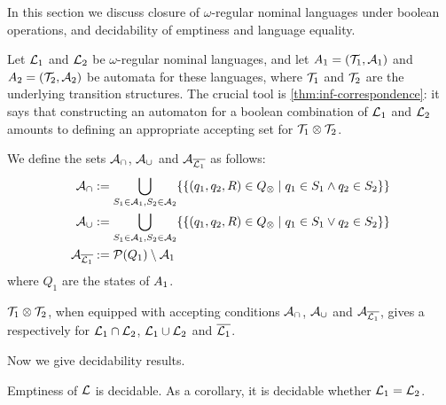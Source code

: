 \newcommand{\compl}[1]{\overline{#1}}
 
In this section we discuss closure of $\omega$-regular nominal languages under boolean operations, and decidability of emptiness and language equality.

Let $\mathcal{L}_1$ and $\mathcal{L}_2$ be $\omega$-regular nominal languages, and let $A_1 = (\mathcal{T}_1,\mathcal{A}_1)$  and $A_2 = (\mathcal{T}_2,\mathcal{A}_2)$ be automata for these languages, where $\mathcal{T}_1$ and $\mathcal{T}_2$ are the underlying transition structures.
The crucial tool is \cref{thm:inf-correspondence}: it says that constructing an automaton for a boolean combination of $\mathcal{L}_1$ and $\mathcal{L}_2$ amounts to defining an appropriate accepting set for $\mathcal{T}_1 \otimes \mathcal{T}_2$.

\begin{definition} We define the sets $\mathcal{A}_\cap$, $\mathcal{A}_\cup$ and $\acc_{\compl{\Lang_1}}$ as follows:
%
\begin{align*}
	\acc_\cap &:= \bigcup_{S_1 \in \acc_1,S_2 \in \acc_2 } \{\{ (q_1,q_2,R) \in \syncQ \mid q_1 \in S_1 \land q_2 \in S_2 \}\} 
	\\
	\acc_\cup &:= \bigcup_{S_1 \in \acc_1,S_2 \in \acc_2 } \{\{(q_1,q_2,R) \in \syncQ \mid q_1 \in S_1 \lor q_2 \in S_2 \}\} 
	\\
	\acc_{\compl{\Lang_1}} &:= \Pow(Q_1) \setminus \acc_1
\end{align*}
%
where $Q_1$ are the states of $A_1$.
%
\end{definition}

\begin{theorem}
$\mathcal{T}_1 \otimes \mathcal{T}_2$, when equipped with accepting conditions $\mathcal{A}_\cap$, $\mathcal{A}_\cup$ and $\acc_{\compl{\Lang_1}}$, gives a \hdma{} respectively for $\mathcal{L}_1 \cap \mathcal{L}_2$, $\mathcal{L}_1 \cup \mathcal{L}_2$ and $\compl{\Lang_1}$.
\label{thm:bool-closure}
\end{theorem}
Now we give decidability results.
%
\begin{theorem}
Emptiness of $\mathcal{L}$ is decidable. As a corollary, it is decidable whether $\mathcal{L}_1 = \mathcal{L}_2$.
\label{thm:emptiness}
\end{theorem}
